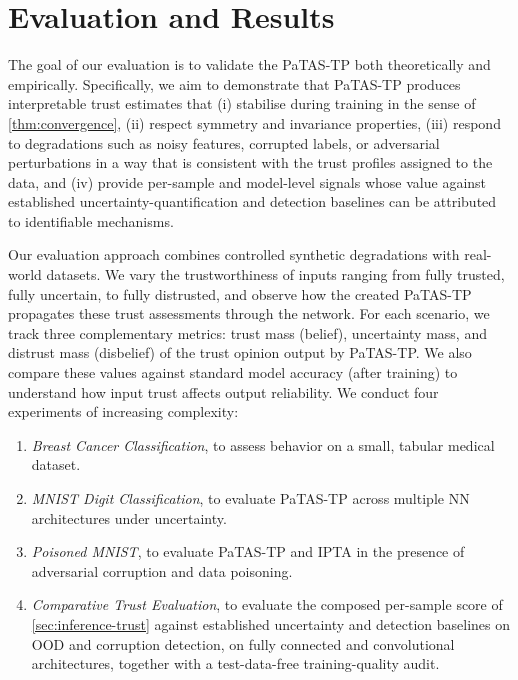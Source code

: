 \section{Evaluation and Results}\label{sec:patas-tp-evaluation}

The goal of our evaluation is to validate the \ac{PaTAS-TP} both theoretically and empirically. Specifically, we aim to demonstrate that \ac{PaTAS-TP} produces interpretable trust estimates that (i) stabilise during training in the sense of \cref{thm:convergence}, (ii) respect symmetry and invariance properties, (iii) respond to degradations such as noisy features, corrupted labels, or adversarial perturbations in a way that is consistent with the trust profiles assigned to the data, and (iv) provide per-sample and model-level signals whose value against established uncertainty-quantification and detection baselines can be attributed to identifiable mechanisms.  

Our evaluation approach combines controlled synthetic degradations with real-world datasets. We vary the trustworthiness of inputs ranging from fully trusted, fully uncertain, to fully distrusted, and observe how the created \ac{PaTAS-TP} propagates these trust assessments through the network. For each scenario, we track three complementary metrics: trust mass (belief), uncertainty mass, and distrust mass (disbelief) of the trust opinion output by \ac{PaTAS-TP}. We also compare these values against standard model accuracy (after training) to understand how input trust affects output reliability. We conduct four experiments of increasing complexity:  
\begin{enumerate}
  \item \emph{Breast Cancer Classification}, to assess behavior on a small, tabular medical dataset.  
  \item \emph{MNIST Digit Classification}, to evaluate \ac{PaTAS-TP} across multiple \ac{NN} architectures under uncertainty.
  \item \emph{Poisoned MNIST}, to evaluate \ac{PaTAS-TP} and \ac{IPTA} in the presence of adversarial corruption and data poisoning.  
  \item \emph{Comparative Trust Evaluation}, to evaluate the composed per-sample score of \cref{sec:inference-trust} against established uncertainty and detection baselines on \ac{OOD} and corruption detection, on fully connected and convolutional architectures, together with a test-data-free training-quality audit.
\end{enumerate}


